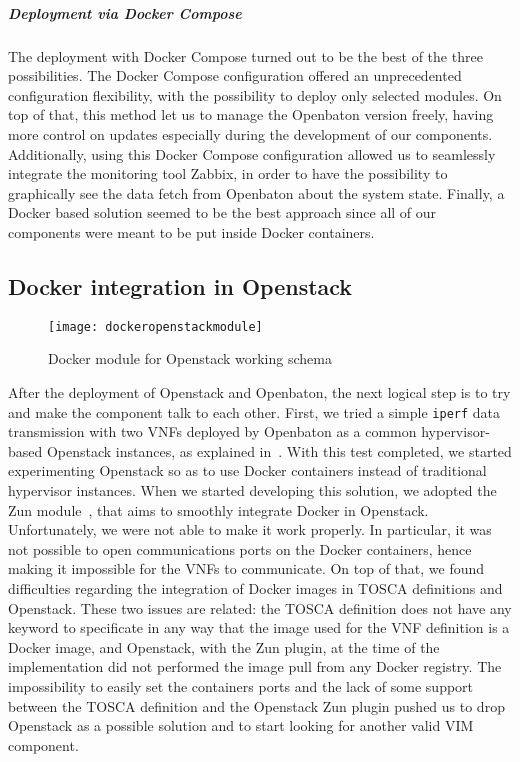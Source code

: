 \subparagraph*{Deployment via Docker Compose}
The deployment with Docker Compose turned out to be the best of the three
possibilities. The Docker Compose configuration offered an unprecedented
configuration flexibility, with the possibility to deploy only selected modules.
On top of that, this method let us to manage the Openbaton version freely,
having more control on updates especially during the development of our
components. Additionally, using this Docker Compose configuration allowed us to
seamlessly integrate the monitoring tool Zabbix, in order to have the
possibility to graphically see the data fetch from Openbaton about the system
state. Finally, a Docker based solution seemed to be the best approach since all
of our components were meant to be put inside Docker containers.

\vfill

\subsection{Docker integration in Openstack}

\begin{figure}[t]
  \centering
  \texttt{[image: dockeropenstackmodule]}
  \caption[Docker module for Openstack working schema]{Docker module for
    Openstack working schema~\cite{openstackDockerModule}}
  \label{chap:archimpl:sec:fistattempt:img:dockeropnestackmodule}
\end{figure}

After the deployment of Openstack and Openbaton, the next logical step is to try
and make the component talk to each other. First, we tried a simple \verb!iperf!
data transmission with two VNFs deployed by Openbaton as a common
hypervisor-based Openstack instances, as explained in~\cite{openbatonIperf}.
With this test completed, we started experimenting Openstack so as to use Docker
containers instead of traditional hypervisor instances. When we started
developing this solution, we adopted the Zun module~\cite{zunmoduleos}, that
aims to smoothly integrate Docker in Openstack. Unfortunately, we were not able
to make it work properly. In particular, it was not possible to open
communications ports on the Docker containers, hence making it impossible for
the VNFs to communicate. On top of that, we found difficulties regarding the
integration of Docker images in TOSCA definitions and Openstack. These two
issues are related: the TOSCA definition does not have any keyword to
specificate in any way that the image used for the VNF definition is a Docker
image, and Openstack, with the Zun plugin, at the time of the implementation did
not performed the image pull from any Docker registry. The impossibility to
easily set the containers ports and the lack of some support between the TOSCA
definition and the Openstack Zun plugin pushed us to drop Openstack as a
possible solution and to start looking for another valid VIM component.

